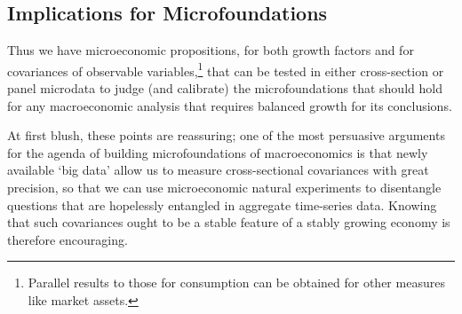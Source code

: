 \documentclass[BufferStockTheory]{subfiles}
\begin{document}

\hypertarget{microfounding-macro-needs-ergodicity}{}
\subsection{Implications for Microfoundations}\label{subsec:microfoundations}

Thus we have microeconomic propositions, for both growth factors and for covariances of observable variables,\footnote{Parallel results to those for consumption can be obtained for other measures like market assets.} that can be tested in either cross-section or panel microdata to judge (and calibrate) the microfoundations that should hold for any macroeconomic analysis that requires balanced growth for its conclusions.

At first blush, these points are reassuring; one of the most persuasive arguments for the agenda of building microfoundations of macroeconomics is that newly available `big data' allow us to measure cross-sectional covariances with great precision, so that we can use microeconomic natural experiments to disentangle questions that are hopelessly entangled in aggregate time-series data.
Knowing that such covariances ought to be a stable feature of a stably growing economy is therefore encouraging.
\end{document}
